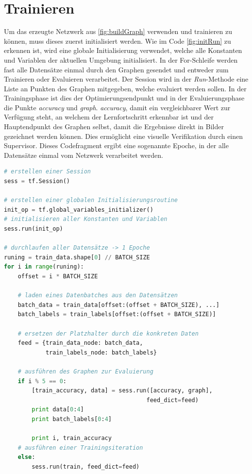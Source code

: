 \section{Trainieren}

Um das erzeugte Netzwerk aus \ref{fig:buildGraph} verwenden und trainieren zu können, muss dieses zuerst initialisiert werden. 
Wie im Code \ref{fig:initRun} zu erkennen ist, wird eine globale Initialisierung verwendet, welche alle Konstanten und Variablen der aktuellen Umgebung initialisiert. 
In der For-Schleife werden fast alle Datensätze einmal durch den Graphen gesendet und entweder zum Trainieren oder Evaluieren verarbeitet. 
Der Session wird in der \textit{Run}-Methode eine Liste an Punkten des Graphen mitgegeben, welche evaluiert werden sollen. 
In der Trainingsphase ist dies der Optimierungsendpunkt und in der Evaluierungsphase die Punkte \textit{accuracy} und \textit{graph}. 
\textit{accuracy}, damit ein vergleichbarer Wert zur Verfügung steht, an welchem der Lernfortschritt erkennbar ist und der Hauptendpunkt des Graphen selbst, damit die Ergebnisse direkt in Bilder gezeichnet werden können. 
Dies ermöglicht eine visuelle Verifikation durch einen Supervisor. 
Dieses Codefragment ergibt eine sogenannte Epoche, in der alle Datensätze einmal vom Netzwerk verarbeitet werden. 
\begin{lstlisting}[caption={Initialisierung des Graphen und Durchführen einer Epoche},label=fig:initRun,captionpos=b,language=Python]
# erstellen einer Session
sess = tf.Session()

# erstellen einer globalen Initialisierungsroutine
init_op = tf.global_variables_initializer()
# initialisieren aller Konstanten und Variablen
sess.run(init_op)

# durchlaufen aller Datensätze -> 1 Epoche
runing = train_data.shape[0] // BATCH_SIZE
for i in range(runing):
    offset = i * BATCH_SIZE
    
    # laden eines Datenbatches aus den Datensätzen
    batch_data = train_data[offset:(offset + BATCH_SIZE), ...]
    batch_labels = train_labels[offset:(offset + BATCH_SIZE)]
    
    # ersetzen der Platzhalter durch die konkreten Daten
    feed = {train_data_node: batch_data, 
            train_labels_node: batch_labels}
     
    # ausführen des Graphen zur Evaluierung
    if i % 5 == 0:
        [train_accuracy, data] = sess.run([accuracy, graph], 
        								 feed_dict=feed)
        print data[0:4]
        print batch_labels[0:4]
        
        print i, train_accuracy
    # ausführen einer Trainingsiteration
    else:
        sess.run(train, feed_dict=feed)
\end{lstlisting}

